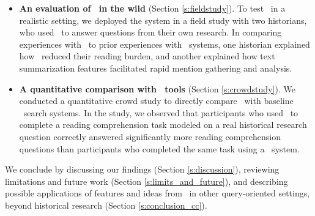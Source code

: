 \begin{itemize}
\item \textbf{An evaluation of \ours~in the wild} (Section \ref{s:fieldstudy}). To test \ours~in a realistic setting, we deployed the system in a field study with two historians, who used \ours~to answer questions from their own research.
In comparing experiences with \ours~to prior experiences with \Baselongname~systems, one historian explained how \ours~reduced their reading burden, and another explained how text summarization features facilitated rapid mention gathering and analysis.
\item \textbf{A quantitative comparison with \Baselongname~tools} (Section \ref{s:crowdstudy}). We conducted a quantitative crowd study to directly compare \ours~with baseline \Baselongname~search systems. In the study, we observed that participants who used \ours~to complete a reading comprehension task modeled on a real historical research question correctly answered significantly more reading comprehension questions than participants who completed the same task using a \Baselongname~system.
\end{itemize}

\noindent We conclude by discussing our findings (Section \ref{s:discussion}), reviewing limitations and future work (Section \ref{s:limits_and_future}), and describing possible applications of features and ideas from \ours~in other query-oriented settings, beyond historical research (Section \ref{s:conclusion_cc}).


